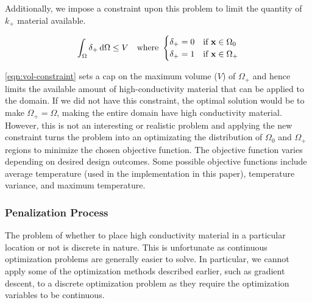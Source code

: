 Additionally, we impose a constraint upon this problem to limit the quantity of $k_+$ material available.

\begin{equation}
	\int_{\Omega}\delta_+\dif\Omega\leq V\quad\text{where }\begin{cases}\delta_+ = 0 & \text{if }\mathbf{x}\in\Omega_0 \\ \delta_+ = 1 & \text{if }\mathbf{x}\in\Omega_+\end{cases}\label{eqn:vol-constraint}
\end{equation}

\eqref{eqn:vol-constraint} sets a cap on the maximum volume ($V$) of $\Omega_+$ and hence limits the available amount of high-conductivity material that can be applied to the domain. If we did not have this constraint, the optimal solution would be to make $\Omega_+=\Omega$, making the entire domain have high conductivity material. However, this is not an interesting or realistic problem and applying the new constraint turns the problem into an optimizating the distribution of $\Omega_0$ and $\Omega_+$ regions to minimize the chosen objective function. The objective function varies depending on desired design outcomes. Some possible objective functions include average temperature (used in the implementation in this paper), temperature variance, and maximum temperature.

\subsubsection*{Penalization Process}
The problem of whether to place high conductivity material in a particular location or not is discrete in nature. This is unfortunate as continuous optimization problems are generally easier to solve. In particular, we cannot apply some of the optimization methods described earlier, such as gradient descent, to a discrete optimization problem as they require the optimization variables to be continuous.

